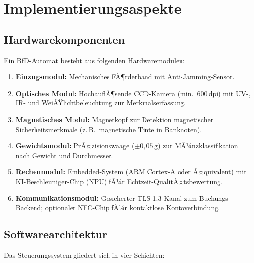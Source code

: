 ﻿\documentclass[a4paper,12pt]{article}
\theoremstyle{definition}
\begin{document}
\section{Implementierungsaspekte}
\label{sec:implementierung}

\subsection{Hardwarekomponenten}

Ein BfD-Automat besteht aus folgenden Hardwaremodulen:

\begin{enumerate}
  \item \textbf{Einzugsmodul:} Mechanisches FÃ¶rderband mit Anti-Jamming-Sensor.
  \item \textbf{Optisches Modul:} HochauflÃ¶sende CCD-Kamera (min.\ 600\,dpi) mit
        UV-, IR- und WeiÃŸlichtbeleuchtung zur Merkmalserfassung.
  \item \textbf{Magnetisches Modul:} Magnetkopf zur Detektion magnetischer
        Sicherheitsmerkmale (z.\,B.\ magnetische Tinte in Banknoten).
  \item \textbf{Gewichtsmodul:} PrÃ¤zisionswaage ($\pm 0{,}05\,\text{g}$) zur
        MÃ¼nzklassifikation nach Gewicht und Durchmesser.
  \item \textbf{Rechenmodul:} Embedded-System (ARM Cortex-A oder Ã¤quivalent)
        mit KI-Beschleuniger-Chip (NPU) fÃ¼r Echtzeit-QualitÃ¤tsbewertung.
  \item \textbf{Kommunikationsmodul:} Gesicherter TLS-1.3-Kanal zum
        Buchungs-Backend; optionaler NFC-Chip fÃ¼r kontaktlose Kontoverbindung.
\end{enumerate}

\subsection{Softwarearchitektur}

Das Steuerungssystem gliedert sich in vier Schichten:
\end{document}
